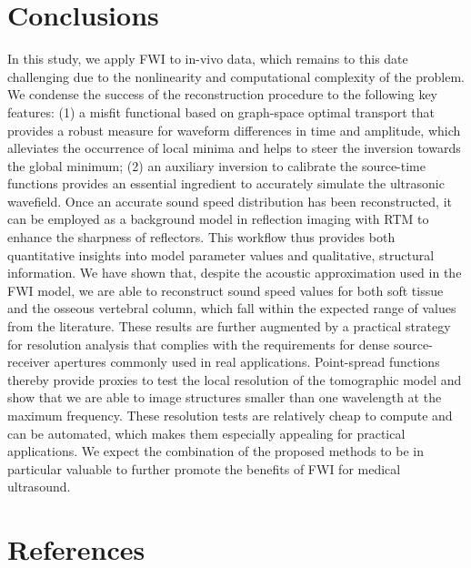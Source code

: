 \documentclass[12pt]{iopart}
\begin{document}
\section{Conclusions}
In this study, we apply FWI to in-vivo data, which remains to this date challenging due to the nonlinearity and computational complexity of the problem. We condense the success of the reconstruction procedure to the following key features: (1) a misfit functional based on graph-space optimal transport that provides a robust measure for waveform differences in time and amplitude, which alleviates the occurrence of local minima and helps to steer the inversion towards the global minimum; (2) an auxiliary inversion to calibrate the source-time functions provides an essential ingredient to accurately simulate the ultrasonic wavefield. Once an accurate sound speed distribution has been reconstructed, it can be employed as a background model in reflection imaging with RTM to enhance the sharpness of reflectors. This workflow thus provides both quantitative insights into model parameter values and qualitative, structural information. We have shown that, despite the acoustic approximation used in the FWI model, we are able to reconstruct sound speed values for both soft tissue and the osseous vertebral column, which fall within the expected range of values from the literature. These results are further augmented by a practical strategy for resolution analysis that complies with the requirements for dense source-receiver apertures commonly used in real applications. Point-spread functions thereby provide proxies to test the local resolution of the tomographic model and show that we are able to image structures smaller than one wavelength at the maximum frequency. These resolution tests are relatively cheap to compute and can be automated, which makes them especially appealing for practical applications. We expect the combination of the proposed methods to be in particular valuable to further promote the benefits of FWI for medical ultrasound. 




\section*{References}
\end{document}

